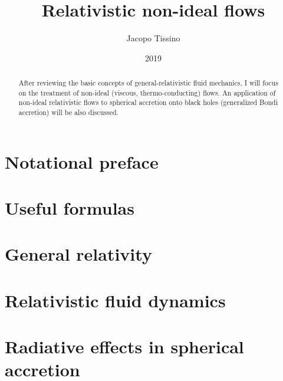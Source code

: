 \documentclass[a4paper, 11pt]{article}
\title{Relativistic non-ideal flows}
\author{Jacopo Tissino}
\date{2019}
\begin{document}


\begin{abstract}
After reviewing the basic concepts of general-relativistic fluid mechanics, I will focus on the treatment of non-ideal
(viscous, thermo-conducting) flows. An application of non-ideal relativistic flows to spherical accretion onto black holes
(generalized Bondi accretion) will be also discussed.
\end{abstract}

\section{Notational preface} \label{sec:notational-preface}


\section{Useful formulas}


\section{General relativity}


\section{Relativistic fluid dynamics}


\section{Radiative effects in spherical accretion}


\printbibliography[title={Bibliography}]

\end{document}
